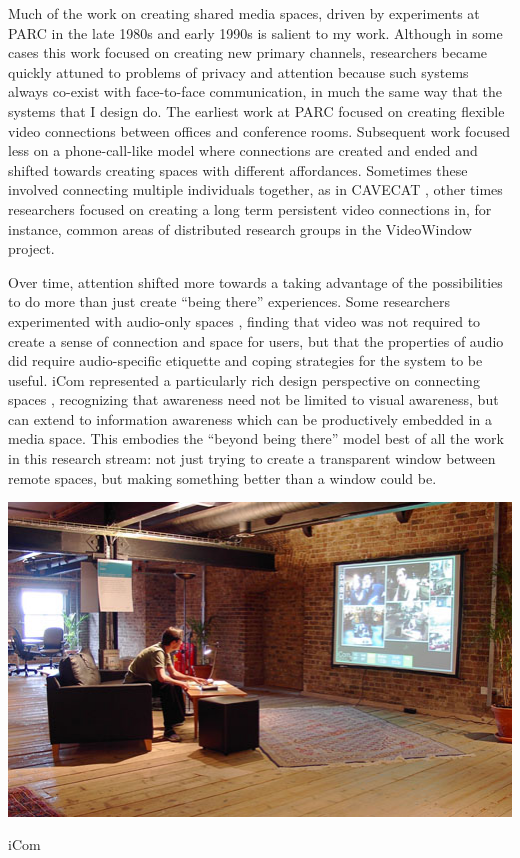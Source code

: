 \documentclass{tufte-handout}
\begin{document}
Much of the work on creating shared media spaces, driven by experiments at PARC in the late 1980s and early 1990s is salient to my work. Although in some cases this work focused on creating new primary channels, researchers became quickly attuned to problems of privacy and attention because such systems always co-exist with face-to-face communication, in much the same way that the systems that I design do. The earliest work at PARC \citep{Olson:1991vz} focused on creating flexible video connections between offices and conference rooms. Subsequent work focused less on a phone-call-like model where connections are created and ended and shifted towards creating spaces with different affordances. Sometimes these involved connecting multiple individuals together, as in CAVECAT \citep{Mantei:1991ww}, other times researchers focused on creating a long term persistent video connections in, for instance, common areas of distributed research groups in the VideoWindow project\citep{Fish:1990fn}. 

Over time, attention shifted more towards a taking advantage of the possibilities to do more than just create ``being there'' experiences. Some researchers experimented with audio-only spaces \citep{Hindus:1996cn}, finding that video was not required to create a sense of connection and space for users, but that the properties of audio did require audio-specific etiquette and coping strategies for the system to be useful. iCom represented a particularly rich design perspective on connecting spaces  \citep{Agamanolis:2006vh}, recognizing that awareness need not be limited to visual awareness, but can extend to information awareness which can be productively embedded in a media space. This embodies the ``beyond being there'' model best of all the work in this research stream: not just trying to create a transparent window between remote spaces, but making something better than a window could be.

\begin{marginfigure}
	\includegraphics{figures/icom.jpg}
	\caption{iCom}
	\label{fig:icom}
\end{marginfigure}
\end{document}
